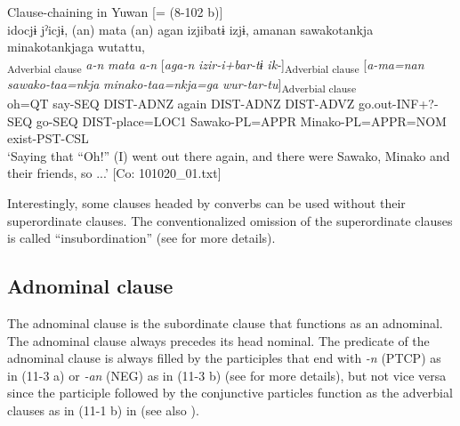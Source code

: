\ea\label{ex:11-2}  Clause-chaining in Yuwan [= (8-102 b)]\\
    \glll idocjɨ  jˀicjɨ,  (an)  mata  (an)  agan izjibatɨ  izjɨ,  amanan  sawakotankja minakotankjaga  wutattu,\\
    [\textit{ido=ccjɨ}  \textit{jˀ-\Highlight{tɨ}}]\textsubscript{Adverbial clause}  \textit{a-n}  \textit{mata}  \textit{a-n}  [\textit{aga-n} \textit{izir-i+bar-tɨ}  \textit{ik-}]\textsubscript{Adverbial clause}\textbf{  }[\textit{a-ma=nan}  \textit{sawako-taa=nkja}  \textit{minako-taa=nkja=ga}  \textit{wur-tar-tu}]\textsubscript{Adverbial clause}\\
    oh=QT  say-SEQ  DIST-ADNZ  again  DIST-ADNZ  DIST-ADVZ go.out-INF+?-SEQ  go-SEQ  DIST-place=LOC1  Sawako-PL=APPR Minako-PL=APPR=NOM  exist-PST-CSL\\
    \glt ‘Saying that “Oh!” (I) went out there again, and there were Sawako, Minako and their friends, so ...’ [Co: 101020\_01.txt]
\z

Interestingly, some clauses headed by converbs can be used without their superordinate clauses. The conventionalized omission of the superordinate clauses is called “insubordination” (see  for more details).

\subsection{Adnominal clause}\label{sec:11.1.2}

The adnominal clause is the subordinate clause that functions as an adnominal. The adnominal clause always precedes its head nominal. The predicate of the adnominal clause is always filled by the participles that end with \textit{{}-n} (PTCP) as in (11-3 a) or \textit{{}-an} (NEG) as in (11-3 b) (see  for more details), but not vice versa since the participle followed by the conjunctive particles function as the adverbial clauses as in (11-1 b) in  (see also ).

